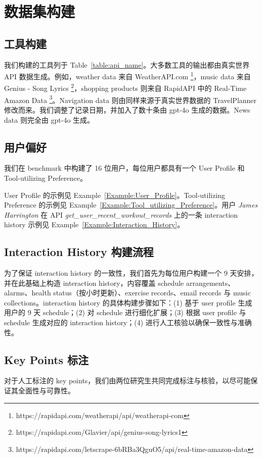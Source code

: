 \documentclass[11pt]{article}
\begin{document}
\section{数据集构建}
\label{sec:dataset_construction}

\subsection{工具构建}
我们构建的工具列于 Table~\ref{table:api_name}。大多数工具的输出都由真实世界 API 数据生成。例如，weather data 来自 WeatherAPI.com \footnote{https://rapidapi.com/weatherapi/api/weatherapi-com}，music data 来自 Genius - Song Lyrics \footnote{https://rapidapi.com/Glavier/api/genius-song-lyrics1}，shopping products 则来自 RapidAPI 中的 Real-Time Amazon Data \footnote{https://rapidapi.com/letscrape-6bRBa3QguO5/api/real-time-amazon-data}。Navigation data 则由同样来源于真实世界数据的 TravelPlanner \cite{xie2024travelplanner} 修改而来。我们调整了记录日期，并加入了数十条由 gpt-4o 生成的数据。News data 则完全由 gpt-4o 生成。

\subsection{用户偏好}
我们在 benchmark 中构建了 16 位用户，每位用户都具有一个 User Profile 和 Tool-utilizing Preference。

User Profile 的示例见 Example~\ref{Example:User_Profile}。Tool-utilizing Preference 的示例见 Example~\ref{Example:Tool_utilizing_Preference}。用户 \textit{James Harrington} 在 API \textit{get\_user\_recent\_workout\_records} 上的一条 interaction history 示例见 Example~\ref{Example:Interaction_History}。



\subsection{Interaction History 构建流程}
\label{sec:appendix_instruction_history}
为了保证 interaction history 的一致性，我们首先为每位用户构建一个 9 天安排，并在此基础上构造 interaction history，内容覆盖 schedule arrangements、alarms、health status（按小时更新）、exercise records、email records 与 music collections。interaction history 的具体构建步骤如下：(1) 基于 user profile 生成用户的 9 天 schedule；(2) 对 schedule 进行细化扩展；(3) 根据 user profile 与 schedule 生成对应的 interaction history；(4) 进行人工核验以确保一致性与准确性。

\subsection{Key Points 标注}
对于人工标注的 key points，我们由两位研究生共同完成标注与核验，以尽可能保证其全面性与可靠性。
\end{document}
